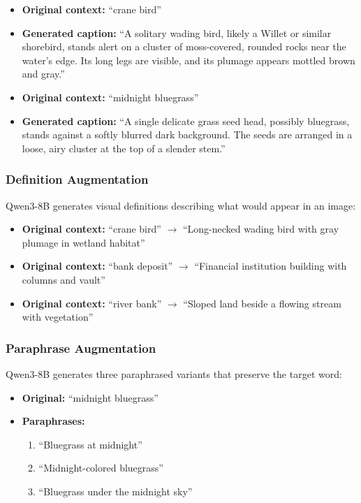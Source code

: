 \documentclass[11pt]{article}
\begin{document}
\begin{itemize}
    \item \textbf{Original context:} ``crane bird''
    \item \textbf{Generated caption:} ``A solitary wading bird, likely a Willet or similar shorebird, stands alert on a cluster of moss-covered, rounded rocks near the water's edge. Its long legs are visible, and its plumage appears mottled brown and gray.''
\end{itemize}

\begin{itemize}
    \item \textbf{Original context:} ``midnight bluegrass''
    \item \textbf{Generated caption:} ``A single delicate grass seed head, possibly bluegrass, stands against a softly blurred dark background. The seeds are arranged in a loose, airy cluster at the top of a slender stem.''
\end{itemize}

\subsubsection{Definition Augmentation}

Qwen3-8B generates visual definitions describing what would appear in an image:

\begin{itemize}
    \item \textbf{Original context:} ``crane bird'' $\rightarrow$ ``Long-necked wading bird with gray plumage in wetland habitat''
    \item \textbf{Original context:} ``bank deposit'' $\rightarrow$ ``Financial institution building with columns and vault''
    \item \textbf{Original context:} ``river bank'' $\rightarrow$ ``Sloped land beside a flowing stream with vegetation''
\end{itemize}

\subsubsection{Paraphrase Augmentation}

Qwen3-8B generates three paraphrased variants that preserve the target word:

\begin{itemize}
    \item \textbf{Original:} ``midnight bluegrass''
    \item \textbf{Paraphrases:}
    \begin{enumerate}
        \item ``Bluegrass at midnight''
        \item ``Midnight-colored bluegrass''
        \item ``Bluegrass under the midnight sky''
    \end{enumerate}
\end{itemize}
\end{document}
